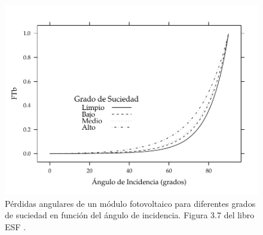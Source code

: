 \begin{figure}[htbp]
\centering
\includegraphics[scale=0.71]{figuras/Suciedad.pdf}
\caption{\label{fig:org443a0e8}Pérdidas angulares de un módulo fotovoltaico para diferentes grados de suciedad en función del ángulo de incidencia. Figura 3.7 del libro ESF \cite{Perpinan2023}.}
\end{figure}

